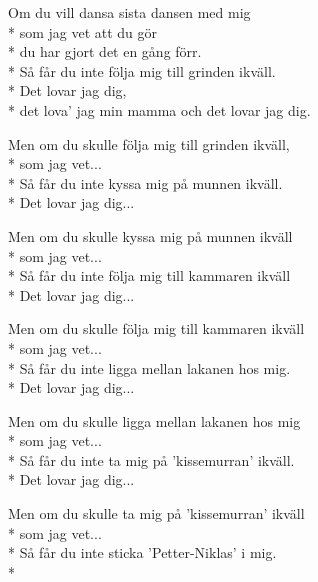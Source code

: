 \begin{SongText}
    \begin{SongVerse}
        Om du vill dansa sista dansen med mig\\*%
        som jag vet att du gör\\*%
        du har gjort det en gång förr.\\*%
        Så får du inte följa mig till grinden ikväll.\\*%
        Det lovar jag dig,\\*%
        det lova' jag min mamma och det lovar jag dig.
    \end{SongVerse}
    \begin{SongVerse}
        Men om du skulle följa mig till grinden ikväll,\\*%
        som jag vet...\\*%
        Så får du inte kyssa mig på munnen ikväll.\\*%
        Det lovar jag dig...
    \end{SongVerse}
    \begin{SongVerse}
        Men om du skulle kyssa mig på munnen ikväll\\*%
        som jag vet...\\*%
        Så får du inte följa mig till kammaren ikväll\\*%
        Det lovar jag dig...
    \end{SongVerse}
    \begin{SongVerse}
        Men om du skulle följa mig till kammaren ikväll\\*%
        som jag vet...\\*%
        Så får du inte ligga mellan lakanen hos mig.\\*%
        Det lovar jag dig...
    \end{SongVerse}
    \begin{SongVerse}
        Men om du skulle ligga mellan lakanen hos mig\\*%
        som jag vet...\\*%
        Så får du inte ta mig på 'kissemurran' ikväll.\\*%
        Det lovar jag dig...
    \end{SongVerse}
    \begin{SongVerse}
        Men om du skulle ta mig på 'kissemurran' ikväll\\*%
        som jag vet...\\*%
        Så får du inte sticka 'Petter-Niklas' i mig.\\*%

\end{SongVerse}
\end{SongText}
